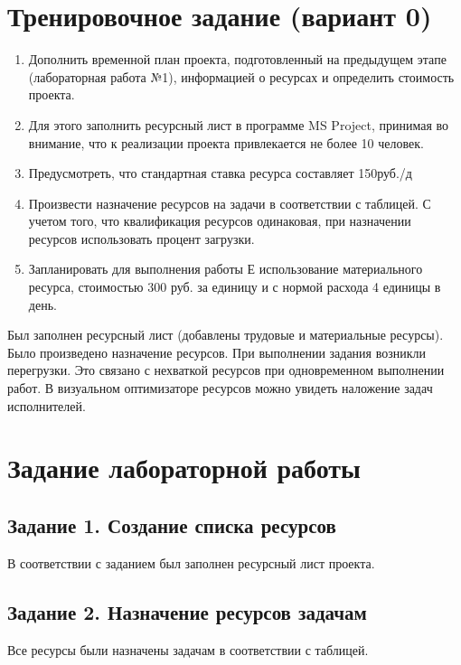 \chapter{Тренировочное задание (вариант 0)}
\begin{enumerate}
    \item Дополнить временной план проекта, подготовленный на предыдущем этапе (лабораторная работа №1), информацией о ресурсах и определить стоимость проекта.
    \item Для этого заполнить ресурсный лист в программе MS Project, принимая во внимание, что к реализации проекта привлекается не более 10 человек.
    \item Предусмотреть, что стандартная ставка ресурса составляет 150руб./д
    \item Произвести назначение ресурсов на задачи в соответствии с таблицей. С учетом того, что квалификация ресурсов одинаковая, при назначении ресурсов использовать процент загрузки.
    \item Запланировать для выполнения работы Е использование материального ресурса, стоимостью 300 руб. за единицу и с нормой расхода 4 единицы в день.
\end{enumerate}

Был заполнен ресурсный лист (добавлены трудовые и материальные ресурсы).
\newpage
Было произведено назначение ресурсов.
\newpage
При выполнении задания возникли перегрузки. Это связано с нехваткой ресурсов при одновременном выполнении работ. В визуальном оптимизаторе ресурсов можно увидеть наложение задач исполнителей.

\chapter{Задание лабораторной работы}
\section*{Задание 1. Создание списка ресурсов}
В соответствии с заданием был заполнен ресурсный лист проекта.

\section*{Задание 2. Назначение ресурсов задачам}
Все ресурсы были назначены задачам в соответствии с таблицей.

